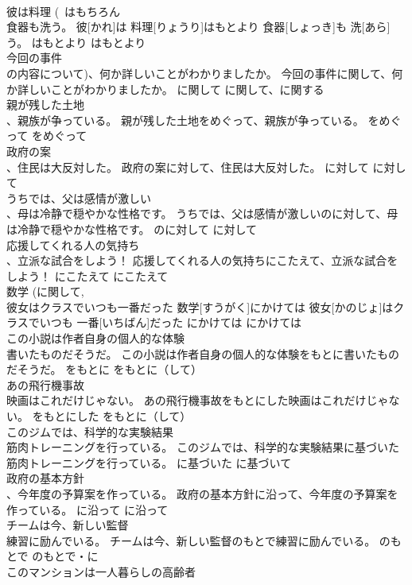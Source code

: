 \documentclass[8pt]{extreport}
\begin{document}
\begin{CJK}{UTF8}{min}
\\	彼は料理 (~はもちろん 
\\	食器も洗う。	彼[かれ]は 料理[りょうり]はもとより 食器[しょっき]も 洗[あら]う。	はもとより	はもとより	
\\	今回の事件 
\\	の内容について)、何か詳しいことがわかりましたか。	今回の事件に関して、何か詳しいことがわかりましたか。	に関して	に関して、に関する	
\\	親が残した土地 
\\	、親族が争っている。	親が残した土地をめぐって、親族が争っている。	をめぐって	をめぐって	
\\	政府の案 
\\	、住民は大反対した。	政府の案に対して、住民は大反対した。	に対して	に対して	
\\	うちでは、父は感情が激しい 
\\	、母は冷静で穏やかな性格です。	うちでは、父は感情が激しいのに対して、母は冷静で穏やかな性格です。	のに対して	に対して	
\\	応援してくれる人の気持ち 
\\	、立派な試合をしよう！	応援してくれる人の気持ちにこたえて、立派な試合をしよう！	にこたえて	にこたえて	
\\	数学 (に関して, 
\\	彼女はクラスでいつも一番だった	数学[すうがく]にかけては 彼女[かのじょ]はクラスでいつも 一番[いちばん]だった	にかけては	にかけては	
\\	この小説は作者自身の個人的な体験 
\\	書いたものだそうだ。	この小説は作者自身の個人的な体験をもとに書いたものだそうだ。	をもとに	をもとに（して）	
\\	あの飛行機事故 
\\	映画はこれだけじゃない。	あの飛行機事故をもとにした映画はこれだけじゃない。	をもとにした	をもとに（して）	
\\	このジムでは、科学的な実験結果 
\\	筋肉トレーニングを行っている。	このジムでは、科学的な実験結果に基づいた筋肉トレーニングを行っている。	に基づいた	に基づいて	
\\	政府の基本方針 
\\	、今年度の予算案を作っている。	政府の基本方針に沿って、今年度の予算案を作っている。	に沿って	に沿って	
\\	チームは今、新しい監督 
\\	練習に励んでいる。	チームは今、新しい監督のもとで練習に励んでいる。	のもとで	のもとで・に	
\\	このマンションは一人暮らしの高齢者 

\end{CJK}
\end{document}

